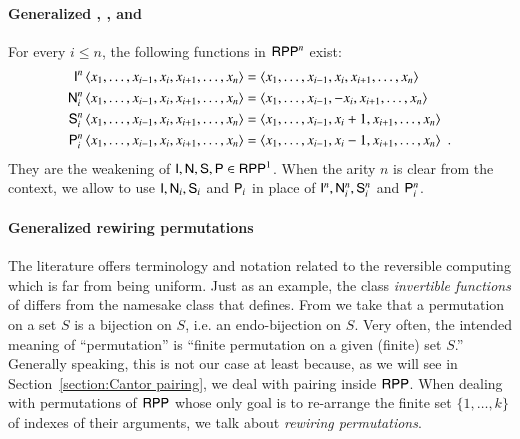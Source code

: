 \paragraph{Generalized \rprIdName, \rprNegName, \rprSuccName and \rprPredName}
For every $ i\leq n $, the following functions in $ \mathsf{RPP}^n $ exist:
\begin{align*}
 \mathsf{I}^n\, \langle x_1, \ldots, x_{i-1}, x_i, x_{i+1}, \ldots, x_n \rangle
 & = \langle x_1, \ldots, x_{i-1}, x_i, x_{i+1}, \ldots,  x_n\rangle
\\
 \mathsf{N}^n_i \, \langle x_1, \ldots, x_{i-1}, x_i, x_{i+1}, \ldots, x_n \rangle
 & = \langle x_1, \ldots, x_{i-1}, -x_i, x_{i+1}, \ldots,  x_n\rangle
\\
 \mathsf{S}^n_i \, \langle x_1, \ldots, x_{i-1}, x_i, x_{i+1}, \ldots, x_n \rangle
  & = \langle x_1, \ldots, x_{i-1}, x_i + 1, x_{i+1}, \ldots,  x_n\rangle
\\
 \mathsf{P}^n_i \, \langle x_1, \ldots, x_{i-1}, x_i, x_{i+1}, \ldots, x_n \rangle
  & = \langle x_1, \ldots, x_{i-1}, x_i - 1, x_{i+1}, \ldots,  x_n\rangle
\enspace .
\end{align*}
They are the weakening of
$ \mathsf{I}, \mathsf{N}, \mathsf{S}, \mathsf{P}\in\mathsf{RPP}^1 $. When the arity $ n $ is clear from the 
context, we allow to use $ \mathsf{I}, \mathsf{N}_i, \mathsf{S}_i $ and $ \mathsf{P}_i $
in place of $ \mathsf{I}^n, \mathsf{N}^n_i, \mathsf{S}^n_i $ and $ \mathsf{P}^n_i $.

\paragraph{Generalized rewiring permutations}

	The literature offers terminology and notation related to the reversible computing which is far from being uniform.
	Just as an example, the class  \emph{invertible functions} of \cite[p.2]{cutland1980book} differs
	from the namesake class that \cite{lane1999algebra} defines.
	From \cite{lane1999algebra} we take that a permutation on a set $S$ is a bijection on $S$, i.e. an endo-bijection
	on $ S $. Very often, the intended meaning of ``permutation'' is ``finite permutation on a given (finite) set $ S $.''
	Generally speaking, this is not our case at least because, as we will see in Section~\ref{section:Cantor pairing}, 
	we deal with pairing inside $ \mathsf{RPP} $. When dealing with permutations of $ \mathsf{RPP} $ whose only
	goal is to re-arrange the finite set $\{1, \ldots, k\}$ of indexes of their arguments, we talk about
	\emph{rewiring permutations}.

